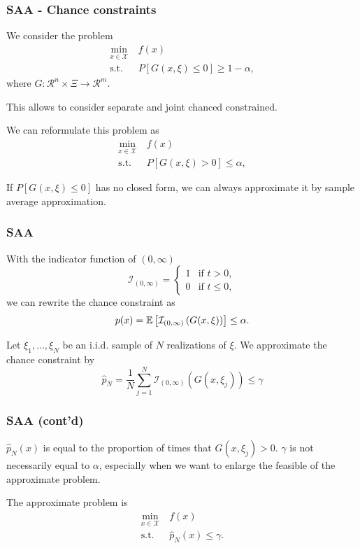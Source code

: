\documentclass{beamer}
\begin{document}
\begin{frame}
	\frametitle{SAA - Chance constraints}
	
	We consider the problem
	\begin{align*}
		\min_{x \in \mathcal{X}}\ & f(x) \\
		\mbox{s.t. } & P[G(x,\xi) \leq 0] \geq 1 - \alpha,
	\end{align*}
	where $G: \mathcal{R}^n \times \Xi \rightarrow \mathcal{R}^m$.
	
	This allows to consider separate and joint chanced constrained.
	
	We can reformulate this problem as
	\begin{align*}
		\min_{x \in \mathcal{X}}\ & f(x) \\
		\mbox{s.t. } & P[G(x,\xi) > 0] \leq \alpha,
	\end{align*}
	
	
	\mbox{}
	
	If $P[G(x,\xi) \leq 0]$ has no closed form, we can always approximate it by sample average approximation.
	
\end{frame}

\begin{frame}
	\frametitle{SAA}
	
	With the indicator function of $(0,\infty)$
	\[
	\mathcal{I}_{(0,\infty)} =
	\begin{cases}
		1 & \mbox{if } t > 0,\\
		0 & \mbox{if } t \leq 0,
	\end{cases}
	\]
	we can rewrite the chance constraint as
	\[
	p(x) = {\mathbb{E}}\left[ \mathcal{I}_{(0,\infty)} \left( G(x, \xi) \right) \right] \leq \alpha.
	\]
	
	Let $\xi_1,\ldots,\xi_N$ be an i.i.d. sample of $N$ realizations of $\xi$.
	We approximate the chance constraint by
	\[
	\hat{p}_N = \frac{1}{N} \sum_{j = 1}^N \mathcal{I}_{(0,\infty)} \left( G(x, \xi_j) \right) \leq \gamma
	\]
	
\end{frame}

\begin{frame}
	\frametitle{SAA (cont'd)}
	
	$\hat{p}_N(x)$ is equal to the proportion of times that $G(x,\xi_j) > 0$.
	$\gamma$ is not necessarily equal to $\alpha$, especially when we want to enlarge the feasible of the approximate problem.
	
	\mbox{}
	
	The approximate problem is
	\begin{align*}
		\min_{x \in \mathcal{X}}\ & f(x) \\
		\mbox{s.t. } & \hat{p}_N(x) \leq \gamma.
	\end{align*}
	
\end{frame}
\end{document}
